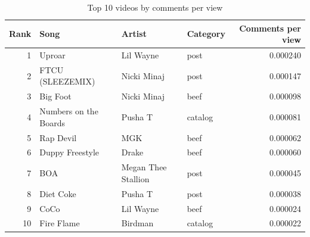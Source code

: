 \begin{table}
\caption{Top 10 videos by comments per view}
\label{tab:table3_comment_per_view}
\begin{tabular}{rlllr}
\toprule
Rank & Song & Artist & Category & Comments per view \\
\midrule
1 & Uproar & Lil Wayne & post & 0.000240 \\
2 & FTCU (SLEEZEMIX) & Nicki Minaj & post & 0.000147 \\
3 & Big Foot & Nicki Minaj & beef & 0.000098 \\
4 & Numbers on the Boards & Pusha T & catalog & 0.000081 \\
5 & Rap Devil & MGK & beef & 0.000062 \\
6 & Duppy Freestyle & Drake & beef & 0.000060 \\
7 & BOA & Megan Thee Stallion & post & 0.000045 \\
8 & Diet Coke & Pusha T & post & 0.000038 \\
9 & CoCo & Lil Wayne & beef & 0.000024 \\
10 & Fire Flame & Birdman & catalog & 0.000022 \\
\bottomrule
\end{tabular}
\end{table}
